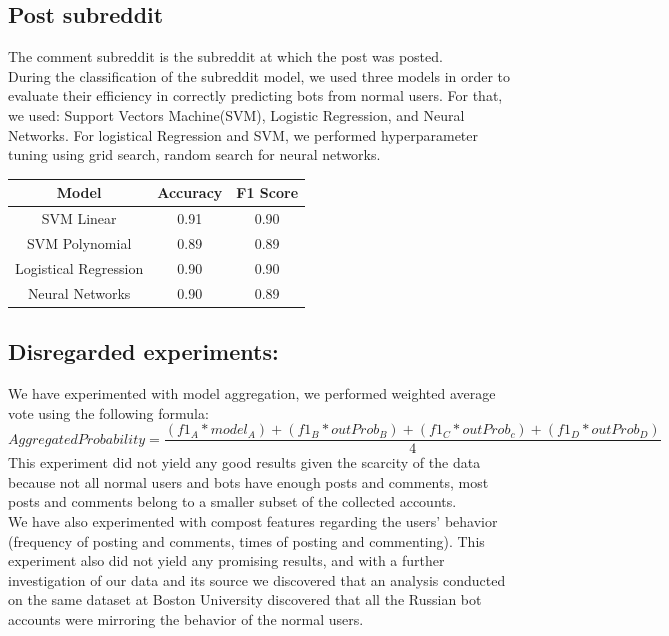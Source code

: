 \documentclass{article}
\begin{document}
    \subsection{Post subreddit}  
    
        The comment subreddit is the subreddit at which the post was posted. \\
    During the classification of  the subreddit model, we used three models in order to evaluate their efficiency in correctly predicting bots from normal users. For that, we used: Support Vectors Machine(SVM), Logistic Regression, and Neural Networks.
For logistical Regression and SVM, we performed hyperparameter tuning using grid search, random search for neural networks.

        \begin{center}
    \begin{tabular}{|c || c| c|} 
     \hline
     Model & Accuracy  & F1 Score  \\ [0.5ex] 
     \hline\hline
     SVM Linear & 0.91  & 0.90 \\ 
     \hline
     SVM Polynomial & 0.89 &0.89 \\
     \hline
     Logistical Regression & 0.90 & 0.90  \\ 
     \hline
     Neural Networks & 0.90  & 0.89\\
     \hline

    \end{tabular}
    \end{center}  
    
            \subsection{Disregarded experiments:}
        We have experimented with model aggregation, we performed weighted average vote using the following formula:
        $$AggregatedProbability = \frac{(f1_A * model_A) 
                                    + (f1_B * outProb_B) 
                                    + (f1_C * outProb_c) 
                                    + (f1_D * outProb_D)}{4}$$
        This experiment did not yield any good results given the scarcity of the data because not all normal users and bots have enough posts and comments, most posts and comments belong to a smaller subset of the collected accounts.\\
       We have also experimented with compost features regarding the users’ behavior (frequency of posting
and comments, times of posting and commenting). This experiment also did not yield any promising results,
and with a further investigation of our data and its source we discovered that an analysis conducted on the
same dataset at Boston University discovered that all the Russian bot accounts were mirroring the behavior
of the normal users. \par
        
\end{document}
